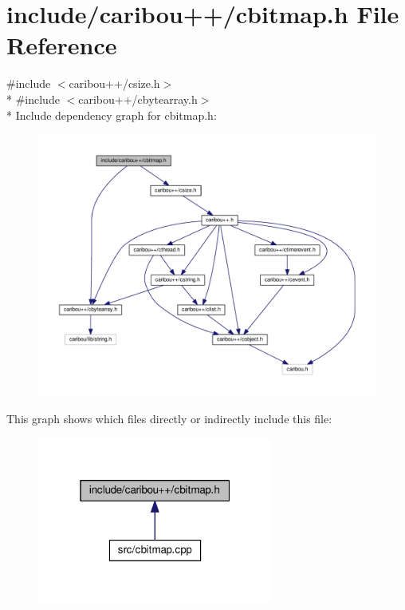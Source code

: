 \section{include/caribou++/cbitmap.h File Reference}
\label{cbitmap_8h}
{\ttfamily \#include $<$caribou++/csize.\+h$>$}\\*
{\ttfamily \#include $<$caribou++/cbytearray.\+h$>$}\\*
Include dependency graph for cbitmap.\+h\+:
\nopagebreak
\begin{figure}[H]
\begin{center}
\leavevmode
\includegraphics[width=350pt]{cbitmap_8h__incl}
\end{center}
\end{figure}
This graph shows which files directly or indirectly include this file\+:
\nopagebreak
\begin{figure}[H]
\begin{center}
\leavevmode
\includegraphics[width=220pt]{cbitmap_8h__dep__incl}
\end{center}
\end{figure}
